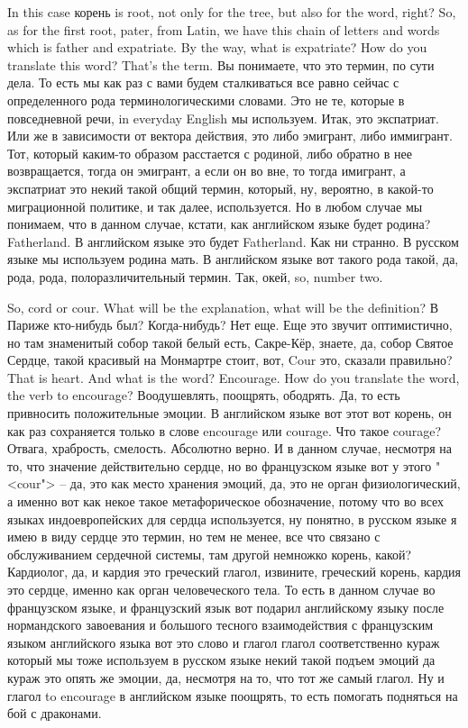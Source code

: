 \documentclass[main.tex]{subfiles}
\begin{document}
In this case корень is root, not only for the tree, but also for the word, right?
So, as for the first root, pater, from Latin, we have this chain of letters and words which is father and expatriate.
By the way, what is expatriate? How do you translate this word? That's the term.
Вы понимаете, что это термин, по сути дела.
То есть мы как раз с вами будем сталкиваться все равно сейчас с определенного рода терминологическими словами.
Это не те, которые в повседневной речи, in everyday English мы используем.
Итак, это экспатриат.
Или же в зависимости от вектора действия, это либо эмигрант, либо иммигрант.
Тот, который каким-то образом расстается с родиной, либо обратно в нее возвращается, тогда он эмигрант, а если он во вне, то тогда имигрант, а экспатриат это некий такой общий термин, который, ну, вероятно, в какой-то миграционной политике, и так далее, используется.
Но в любом случае мы понимаем, что в данном случае, кстати, как английском языке будет родина? Fatherland.
В английском языке это будет Fatherland.
Как ни странно.
В русском языке мы используем родина мать.
В английском языке вот такого рода такой, да, рода, рода, полоразличительный термин.
Так, окей, so, number two.

So, cord or cour.
What will be the explanation, what will be the definition?
В Париже кто-нибудь был? Когда-нибудь? Нет еще. Еще это звучит оптимистично, но там знаменитый собор такой белый есть, Сакре-Кёр, знаете, да, собор Святое Сердце, такой красивый на Монмартре стоит, вот, Cour это, сказали правильно?
That is heart.
And what is the word? Encourage.
How do you translate the word, the verb to encourage?
Воодушевлять, поощрять, ободрять.
Да, то есть привносить положительные эмоции.
В английском языке вот этот вот корень, он как раз сохраняется только в слове encourage или courage.
Что такое courage? Отвага, храбрость, смелость.
Абсолютно верно.
И в данном случае, несмотря на то, что значение действительно сердце, но во французском языке вот у этого "<cour"> -- да, это как место хранения эмоций, да, это не орган физиологический, а именно вот как некое такое метафорическое обозначение, потому что во всех языках индоевропейских для сердца используется, ну понятно, в русском языке я имею в виду сердце это термин, но тем не менее, все что связано с обслуживанием сердечной системы, там другой немножко корень, какой? Кардиолог, да, и кардия это греческий глагол, извините, греческий корень, кардия это сердце, именно как орган человеческого тела.
То есть в данном случае во французском языке, и французский язык вот подарил английскому языку после нормандского завоевания и большого тесного взаимодействия с французским языком английского языка вот это слово и глагол глагол соответственно кураж который мы тоже используем в русском языке некий такой подъем эмоций да кураж это опять же эмоции, да, несмотря на то, что тот же самый глагол.
Ну и глагол to encourage в английском языке поощрять, то есть помогать подняться на бой с драконами.
\end{document}
